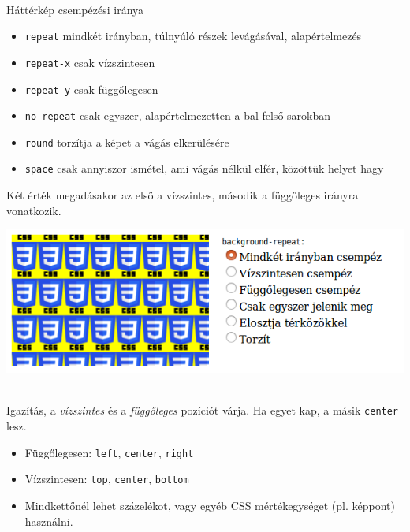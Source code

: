 \begin{frame}
  \begin{description}[m]
    \item[\texttt{background-repeat}] \hfill \\ Háttérkép 
    csempézési iránya
    \begin{itemize}
      \item \texttt{repeat} mindkét irányban, túlnyúló részek 
      levágásával, alapértelmezés
      \item \texttt{repeat-x} csak vízszintesen
      \item \texttt{repeat-y} csak függőlegesen
      \item \texttt{no-repeat} csak egyszer, alapértelmezetten a bal 
      felső sarokban
      \item \texttt{round} torzítja a képet a vágás elkerülésére
      \item \texttt{space} csak annyiszor ismétel, ami vágás 
      nélkül elfér, közöttük helyet hagy
    \end{itemize}
    Két érték megadásakor az első a vízszintes, második a 
    függőleges irányra vonatkozik.
  \end{description}
\end{frame}

\begin{frame}
  \begin{exampleblock}{}
    \begin{center}
      \includegraphics[width=.75\textwidth]{hatter.png}
    \end{center}
  \end{exampleblock}
\end{frame}

\begin{frame}
  \begin{description}[m]
    \item[\texttt{background-position}] \hfill \\ Igazítás, a 
      \emph{vízszintes} és a \emph{függőleges} pozíciót várja. Ha egyet 
      kap, a másik \texttt{center} lesz.
      \begin{itemize}
        \item Függőlegesen: \texttt{left}, \texttt{center}, 
        \texttt{right}
        \item Vízszintesen: \texttt{top}, \texttt{center}, 
        \texttt{bottom}
        \item Mindkettőnél lehet százelékot, vagy egyéb CSS 
        mértékegységet (pl. képpont) használni. 
      \end{itemize}
  \end{description}
\end{frame}

